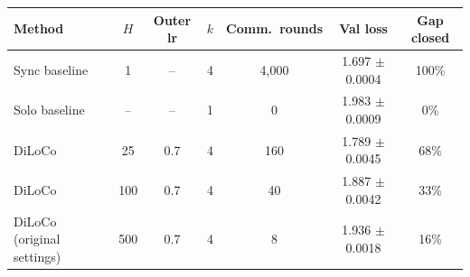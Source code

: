 \begin{tabular}{lcccccc}
\toprule
Method & $H$ & Outer lr & $k$ & Comm.\ rounds & Val loss & Gap closed \\
\midrule
Sync baseline & 1 & -- & 4 & 4{,}000 & 1.697 $\pm$ 0.0004 & 100\% \\
Solo baseline & -- & -- & 1 & 0 & 1.983 $\pm$ 0.0009 & 0\% \\
DiLoCo & 25 & 0.7 & 4 & 160 & 1.789 $\pm$ 0.0045 & 68\% \\
DiLoCo & 100 & 0.7 & 4 & 40 & 1.887 $\pm$ 0.0042 & 33\% \\
DiLoCo (original settings) & 500 & 0.7 & 4 & 8 & 1.936 $\pm$ 0.0018 & 16\% \\
\bottomrule
\end{tabular}
